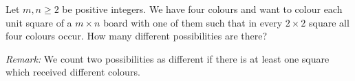 Let $m, n \geq 2$ be positive integers. We have four colours and want to colour each unit square of a $m \times n$ board with one of them such that in every $2 \times 2$ square all four colours occur. How many different possibilities are there?

\emph{Remark:} We count two possibilities as different if there is at least one square which received different colours.

